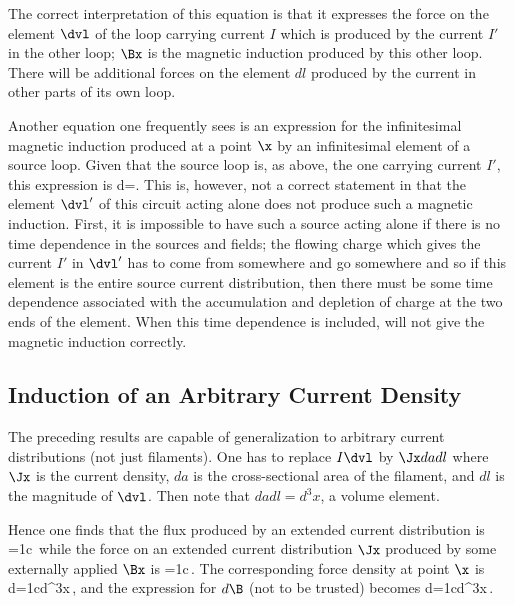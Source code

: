\centerline{}

\noindent The correct interpretation of this equation is that it 
expresses the force
on the element $\dvl$ of the loop carrying current $I$ which is produced by
the current $I'$ in the other loop; $\Bx$ is the magnetic induction
produced by this other loop. There will be additional forces on the element
$dl$ produced by the current in other parts of its own loop.

Another equation one frequently sees is an expression for the infinitesimal
magnetic induction produced at a point $\x$ by an infinitesimal element of
a source loop. Given that the source loop is, as above, the one carrying
current $I'$, this expression is
\beq
d\Bx=.
\eeq
This is, however, not a correct statement in that the element $\dvl'$ of this
circuit acting alone does not produce such a magnetic induction. First, it is
impossible to have such a source acting alone if there is no time
dependence in the sources and fields; the flowing charge which gives the
current $I'$ in $\dvl'$ has to come from somewhere and go somewhere and so
if this element is the entire source current distribution, then there must be
some time dependence associated with the accumulation and depletion of
charge at the two ends of the element. When this time dependence is 
included,  will not give the magnetic induction correctly.

\subsection{Induction of an Arbitrary Current Density}
The preceding results are capable of generalization to arbitrary current
distributions (not just filaments). One has to replace $I\dvl$ by $\Jx dadl$
where $\Jx$ is the current density, $da$ is the cross-sectional area of the
filament, and $dl$ is the magnitude of $\dvl$. Then note that $dadl=d^3x$, a
volume element. 

\centerline{}

\noindent Hence one finds that the flux produced by an extended
current distribution is
\beq
\Bx=\frac1c\inivp\,
\eeq
while the force on an extended current distribution $\Jx$ produced by some
externally applied $\Bx$ is
\beq
\F=\frac1c\iniv\,\Jx\times\Bx.
\eeq
The corresponding force density at point $\x$ is
\beq
d\F=\frac1cd^3x\,\Jx\times\Bx,
\eeq
and the expression for $d\B$ (not to be trusted) becomes
\beq
d\Bx=\frac1cd^3x\,.
\eeq


